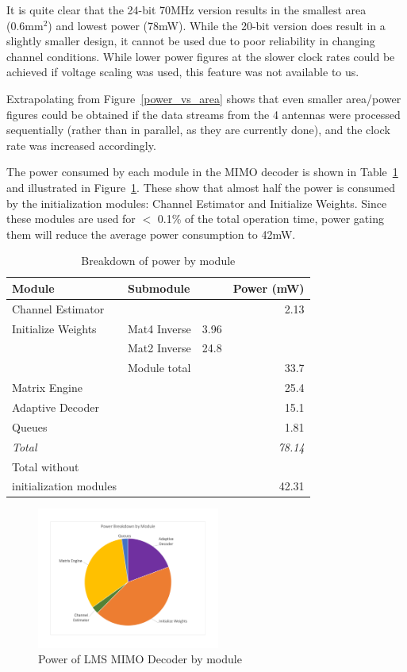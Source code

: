 \documentclass[journal]{IEEEtran}
\begin{document}
It is quite clear that the 24-bit 70MHz version results in the smallest area (0.6mm$^2$) and lowest power (78mW). While the 20-bit version does result in a slightly smaller design, it cannot be used due to poor reliability in changing channel conditions. While lower power figures at the slower clock rates could be achieved if voltage scaling was used, this feature was not available to us.

Extrapolating from Figure~\ref{power_vs_area} shows that even smaller area/power figures could be obtained if the data streams from the 4 antennas were processed sequentially (rather than in parallel, as they are currently done), and the clock rate was increased accordingly.

The power consumed by each module in the MIMO decoder is shown in Table~\ref{power_breakdown_table} and illustrated in Figure~\ref{power_breakdown_module}. These show that almost half the power is consumed by the initialization modules: Channel Estimator and Initialize Weights. Since these modules are used for $<$ 0.1\% of the total operation time, power gating them will reduce the average power consumption to 42mW.

\begin{table}[!h]
\caption{Breakdown of power by module}
\label{power_breakdown_table}
\centering
\begin{tabular}{l l l r}
\hline
Module & Submodule & & Power (mW) \\
\hline
Channel Estimator & & & 2.13 \\
Initialize Weights & Mat4 Inverse & 3.96 & \\
 & Mat2 Inverse & 24.8 & \\
 & Module total & & 33.7 \\
Matrix Engine & & & 25.4 \\
Adaptive Decoder & & & 15.1 \\
Queues & & & 1.81 \\
\hline
\em{Total} & & & \em{78.14} \\
Total without & & & \\
initialization modules & & & 42.31 \\
\hline
\end{tabular}
\end{table}

\begin{figure}[!h]
\centering
\includegraphics*[width=6cm, viewport = 90 100 660 540]{images/power_breakdown_module.pdf}
\caption{Power of LMS MIMO Decoder by module}
\label{power_breakdown_module}
\end{figure}
\end{document}
